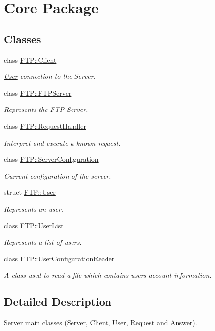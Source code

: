 \hypertarget{group__core}{}\section{Core Package}
\label{group__core}
\subsection*{Classes}
\begin{DoxyCompactItemize}
\item 
class \hyperlink{classFTP_1_1Client}{F\+T\+P\+::\+Client}
\begin{DoxyCompactList}\small\item\em \hyperlink{structFTP_1_1User}{User} connection to the Server. \end{DoxyCompactList}\item 
class \hyperlink{classFTP_1_1FTPServer}{F\+T\+P\+::\+F\+T\+P\+Server}
\begin{DoxyCompactList}\small\item\em Represents the F\+T\+P Server. \end{DoxyCompactList}\item 
class \hyperlink{classFTP_1_1RequestHandler}{F\+T\+P\+::\+Request\+Handler}
\begin{DoxyCompactList}\small\item\em Interpret and execute a known request. \end{DoxyCompactList}\item 
class \hyperlink{classFTP_1_1ServerConfiguration}{F\+T\+P\+::\+Server\+Configuration}
\begin{DoxyCompactList}\small\item\em Current configuration of the server. \end{DoxyCompactList}\item 
struct \hyperlink{structFTP_1_1User}{F\+T\+P\+::\+User}
\begin{DoxyCompactList}\small\item\em Represents an user. \end{DoxyCompactList}\item 
class \hyperlink{classFTP_1_1UserList}{F\+T\+P\+::\+User\+List}
\begin{DoxyCompactList}\small\item\em Represents a list of users. \end{DoxyCompactList}\item 
class \hyperlink{classFTP_1_1UserConfigurationReader}{F\+T\+P\+::\+User\+Configuration\+Reader}
\begin{DoxyCompactList}\small\item\em A class used to read a file which contains user\textquotesingle{}s account information. \end{DoxyCompactList}\end{DoxyCompactItemize}


\subsection{Detailed Description}
Server main classes (Server, Client, User, Request and Answer). 